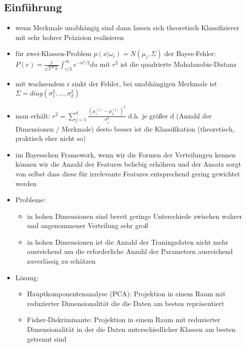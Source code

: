 \documentclass{article} %
\begin{document}
	\subsection{Einführung}
	\begin{itemize}
		\item wenn Merkmale unabhängig sind dann lassen sich theoretisch Klassifizierer mit sehr hohrer Präzision realisieren
		\item für zwei-Klassen-Problem $p(x|\omega_i) = N(\mu_i,\Sigma)$ der Bayes-Fehler: $P(e) = \frac{1}{\sqrt{2*\pi}}\int_{r/2}^{\infty} e^{-u^2/2} du$ mit $r^2$ ist die quadrierte Mahalanobis-Distanz
		\item mit wachsendem r sinkt der Fehler, bei unabhängigen Merkmale ist $\Sigma = diag(\sigma_1^2,\dots,\sigma_d^2)$ 
		\item man erhält: $r^2 = \sum_{j=1}^{d} \frac{(\mu_1^{(j)}-\mu_2^{(j)})^2}{\sigma_j^2}$ d.h. je größer d (Anzahl der Dimensionen / Merkmale) desto besser ist die Klassifikation (theoretisch, praktisch eher nicht so)
		\item im Bayesschen Framework, wenn wir die Formen der Verteilungen kennen können wir die Anzahl der Features beliebig erhöhren und der Ansatz sorgt von selbst dass diese für irrelevante Features entsprechend gering gewichtet werden
		\item Probleme:
		\begin{itemize}
			\item in hohen Dimensionen sind bereit geringe Unterschiede zwischen wahrer und angenommener Verteilung sehr groß
			\item in hohen Dimensionen ist die Anzahl der Traningsdaten nicht mehr ausreichend um die erforderliche Anzahl der Parametern ausreichend zuverlässig zu schätzen
		\end{itemize}
		\item Lösung:
		\begin{itemize}
			\item Hauptkomponentenanalyse (PCA): Projektion in einem Raum mit reduzierter Dimensionalität die die Daten am besten repräsentiert
			\item Fisher-Diskriminante: Projektion in einem Raum mit reduzierter Dimensionalität in der die  Daten unterschiedlicher Klassen am besten getrennt sind
		\end{itemize}
	\end{itemize}
\end{document}
